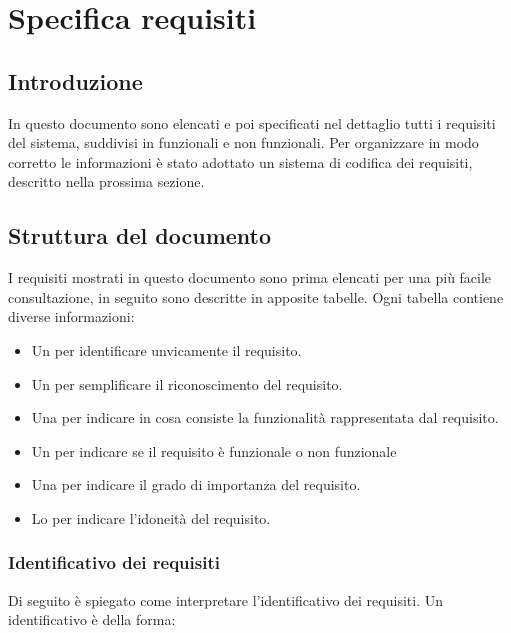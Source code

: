 \chapter{Specifica requisiti} 
\label{cha:specifica_sistema}

\section{Introduzione} 
In questo documento sono elencati e poi specificati nel dettaglio tutti i requisiti del sistema, suddivisi in funzionali e non funzionali.
Per organizzare in modo corretto le informazioni è stato adottato un sistema di codifica dei requisiti, descritto nella prossima sezione.

\section{Struttura del documento}
\label{cha:struttura_del_documento}

I requisiti mostrati in questo documento sono prima elencati per una più facile consultazione, in seguito sono descritte in apposite tabelle. 
Ogni tabella contiene diverse informazioni:
\begin{itemize}
	\item Un  per identificare unvicamente il requisito.
	\item Un  per semplificare il riconoscimento del requisito.
	\item Una  per indicare in cosa consiste la funzionalità rappresentata dal requisito.
	\item Un  per indicare se il requisito è funzionale o non funzionale
	\item Una  per indicare il grado di importanza del requisito.
	\item Lo  per indicare l'idoneità del requisito.
\end{itemize}

\subsection{Identificativo dei requisiti}
\label{cha:identificativo_dei_requisiti}

Di seguito è spiegato come interpretare l'identificativo dei requisiti.
Un identificativo è della forma:
\begin{center}
\end{center}

